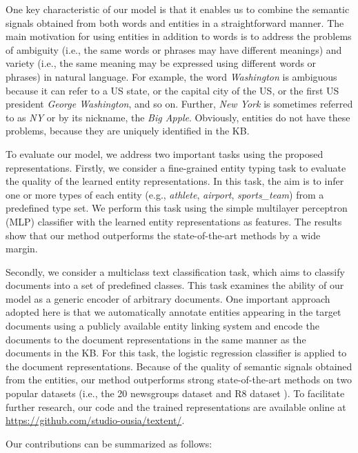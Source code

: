 \documentclass[11pt]{article}
\begin{document}
  One key characteristic of our model is that it enables us to combine the semantic signals obtained from both words and entities in a straightforward manner.
  The main motivation for using entities in addition to words is to address the problems of ambiguity (i.e., the same words or phrases may have different meanings) and variety (i.e., the same meaning may be expressed using different words or phrases) in natural language.
  For example, the word \textit{Washington} is ambiguous because it can refer to a US state, or the capital city of the US, or the first US president \textit{George Washington}, and so on.
  Further, \textit{New York} is sometimes referred to as \textit{NY} or by its nickname, the \textit{Big Apple}.
  Obviously, entities do not have these problems, because they are uniquely identified in the KB.

  To evaluate our model, we address two important tasks using the proposed representations.
  Firstly, we consider a fine-grained entity typing task \cite{yaghoobzadeh-schutze:2015:EMNLP} to evaluate the quality of the learned entity representations.
  In this task, the aim is to infer one or more types of each entity (e.g., \textit{athlete}, \textit{airport}, \textit{sports\_team}) from a predefined type set.
  We perform this task using the simple multilayer perceptron (MLP) classifier with the learned entity representations as features.
  The results show that our method outperforms the state-of-the-art methods by a wide margin.

  Secondly, we consider a multiclass text classification task, which aims to classify documents into a set of predefined classes.
  This task examines the ability of our model as a generic encoder of arbitrary documents.
  One important approach adopted here is that we automatically annotate entities appearing in the target documents using a publicly available entity linking system and encode the documents to the document representations in the same manner as the documents in the KB.
  For this task, the logistic regression classifier is applied to the document representations.
  Because of the quality of semantic signals obtained from the entities, our method outperforms strong state-of-the-art methods on two popular datasets (i.e., the 20 newsgroups dataset \cite{Lang1995} and R8 dataset \cite{Debole2005}).
  To facilitate further research, our code and the trained representations are available online at \url{https://github.com/studio-ousia/textent/}.

  Our contributions can be summarized as follows:
\end{document}
